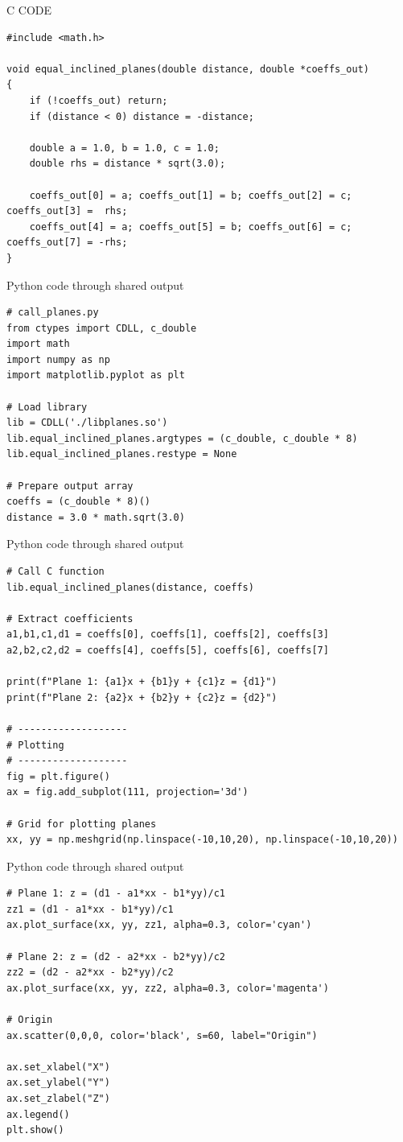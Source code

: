 \documentclass{beamer}
\begin{document}
\begin{frame}[fragile]{C CODE}
\begin{lstlisting}
#include <math.h>

void equal_inclined_planes(double distance, double *coeffs_out)
{
    if (!coeffs_out) return;
    if (distance < 0) distance = -distance;

    double a = 1.0, b = 1.0, c = 1.0;
    double rhs = distance * sqrt(3.0);

    coeffs_out[0] = a; coeffs_out[1] = b; coeffs_out[2] = c; coeffs_out[3] =  rhs;
    coeffs_out[4] = a; coeffs_out[5] = b; coeffs_out[6] = c; coeffs_out[7] = -rhs;
}
 \end{lstlisting}
\end{frame}

\begin{frame}[fragile]{Python code through shared output}
\begin{lstlisting}
# call_planes.py
from ctypes import CDLL, c_double
import math
import numpy as np
import matplotlib.pyplot as plt

# Load library
lib = CDLL('./libplanes.so')
lib.equal_inclined_planes.argtypes = (c_double, c_double * 8)
lib.equal_inclined_planes.restype = None

# Prepare output array
coeffs = (c_double * 8)()
distance = 3.0 * math.sqrt(3.0)
 \end{lstlisting}
\end{frame}
\begin{frame}[fragile]{Python code through shared output}
\begin{lstlisting}
# Call C function
lib.equal_inclined_planes(distance, coeffs)

# Extract coefficients
a1,b1,c1,d1 = coeffs[0], coeffs[1], coeffs[2], coeffs[3]
a2,b2,c2,d2 = coeffs[4], coeffs[5], coeffs[6], coeffs[7]

print(f"Plane 1: {a1}x + {b1}y + {c1}z = {d1}")
print(f"Plane 2: {a2}x + {b2}y + {c2}z = {d2}")

# -------------------
# Plotting
# -------------------
fig = plt.figure()
ax = fig.add_subplot(111, projection='3d')

# Grid for plotting planes
xx, yy = np.meshgrid(np.linspace(-10,10,20), np.linspace(-10,10,20))
 \end{lstlisting}
\end{frame}
\begin{frame}[fragile]{Python code through shared output}
\begin{lstlisting}
# Plane 1: z = (d1 - a1*xx - b1*yy)/c1
zz1 = (d1 - a1*xx - b1*yy)/c1
ax.plot_surface(xx, yy, zz1, alpha=0.3, color='cyan')

# Plane 2: z = (d2 - a2*xx - b2*yy)/c2
zz2 = (d2 - a2*xx - b2*yy)/c2
ax.plot_surface(xx, yy, zz2, alpha=0.3, color='magenta')

# Origin
ax.scatter(0,0,0, color='black', s=60, label="Origin")

ax.set_xlabel("X")
ax.set_ylabel("Y")
ax.set_zlabel("Z")
ax.legend()
plt.show()
 \end{lstlisting}
\end{frame}
\end{document}
